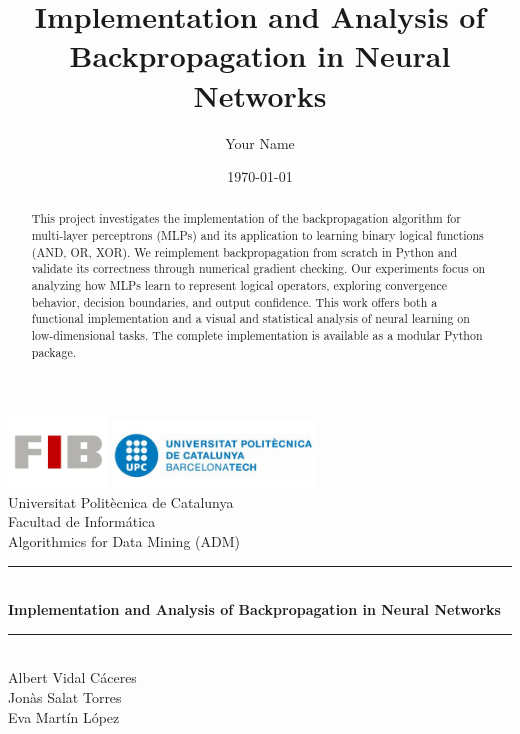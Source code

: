 \documentclass[11pt,a4paper]{article}
\title{Implementation and Analysis of Backpropagation in Neural Networks}
\author{Your Name}
\date{\today}
\newcommand{\HRule}{\rule{\linewidth}{0.5mm}}
\begin{document}
\begin{titlepage}

\sffamily

\begin{center}

\includegraphics[width=0.2\textwidth]{figures/FIB.jpg}
\hfill
\includegraphics[width=0.4\textwidth]{figures/UPC.jpg}  
\\[4cm]

{\Large Universitat Politècnica de Catalunya}\\[0.5cm]
{\Large Facultad de Informática}\\[0.5cm]
{\Large Algorithmics for Data Mining (ADM)}\\[2cm]

\HRule \\[0.4cm]
{ \huge \bfseries Implementation and Analysis of Backpropagation in Neural Networks}\\[0.4cm]
\HRule \\[1.5cm]

{\Large Albert Vidal Cáceres}\\[0.5cm]
{\Large Jonàs Salat Torres}\\[0.5cm]
{\Large Eva Martín López}\\[0.5cm]

\vfill
\end{center}
\end{titlepage}

\tableofcontents
\newpage

\begin{abstract}
This project investigates the implementation of the backpropagation algorithm for multi-layer perceptrons (MLPs) and its application to learning binary logical functions (AND, OR, XOR). We reimplement backpropagation from scratch in Python and validate its correctness through numerical gradient checking. Our experiments focus on analyzing how MLPs learn to represent logical operators, exploring convergence behavior, decision boundaries, and output confidence. This work offers both a functional implementation and a visual and statistical analysis of neural learning on low-dimensional tasks. The complete implementation is available as a modular Python package.
\end{abstract}
\end{document}
